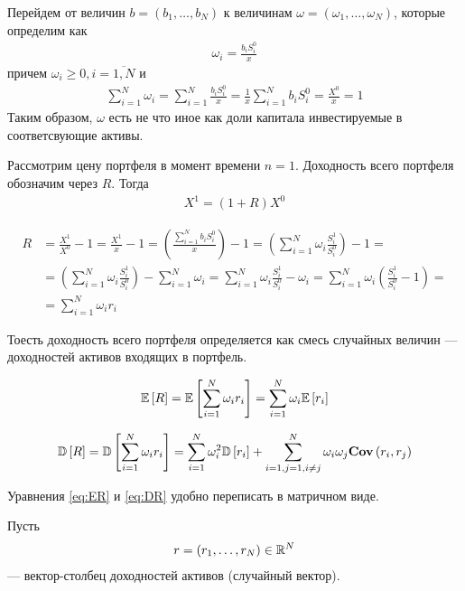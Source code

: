 Перейдем от величин $b = (b_1, \dots, b_N)$ к величинам $\omega = (\omega_1, \dots, \omega_N)$, которые определим как
\begin{align}
	\omega_i = \frac{b_i S_i^0}{x}
\end{align}
причем $\omega_i \ge 0, i=\overline{1, N}$ и
\begin{align}
	\sum_{i=1}^{N} \omega_i 
	= \sum_{i=1}^{N} \frac{b_i S_i^0}{x}
	= \frac{1}{x} \sum_{i=1}^{N} b_i S_i^0
	= \frac{X^0}{x} = 1
\end{align}
Таким образом, $\omega$ есть не что иное как доли капитала инвестируемые в соответсвующие активы.

Рассмотрим цену портфеля в момент времени $n=1$. Доходность всего портфеля обозначим через $R$. Тогда
\begin{align}
	X^1 = (1 + R) X^0
\end{align}

\begin{align}
	R &= \frac{X^1}{X^0} - 1 
	= \frac{X^1}{x} - 1 
	= \left(\frac{\sum_{i=1}^{N}b_i S_i^0}{x}\right) - 1 
	= \left(\sum_{i=1}^{N} \omega_i \frac{S_i^1}{S_i^0}\right) - 1 = \\
	&= \left(\sum_{i=1}^{N} \omega_i \frac{S_i^1}{S_i^0}\right) - \sum_{i=1}^{N} \omega_i
	= \sum_{i=1}^{N} \omega_i \frac{S_i^1}{S_i^0} - \omega_i 
	= \sum_{i=1}^{N} \omega_i \left(\frac{S_i^1}{S_i^0} - 1\right) = \\
	&= \sum_{i=1}^{N} \omega_i r_i
\end{align}

Тоесть доходность всего портфеля определяется как смесь случайных величин --- доходностей активов
входящих в портфель.

\begin{align} \label{eq:ER}
	\mathbb{E}\left[R\right] = \mathbb{E}\left[\sum_{i=1}^{N} \omega_i r_i\right] 
	= \sum_{i=1}^{N} \omega_i \mathbb{E}\left[r_i\right]
\end{align}

\begin{align} \label{eq:DR}
	\mathbb{D}\left[R\right] = \mathbb{D}\left[\sum_{i=1}^{N} \omega_i r_i\right] 
	= \sum_{i=1}^{N} \omega_i^2 \mathbb{D}\left[r_i\right] 
	+ \sum_{i=1, j=1, i \ne j}^{N} \omega_i \omega_j \textbf{Cov}\left(r_i, r_j\right)
\end{align}

Уравнения \ref{eq:ER} и \ref{eq:DR} удобно переписать в матричном виде. 

Пусть 
\begin{align}
	r = (r_1, \dots, r_N) \in \mathbb{R}^N
\end{align}
--- вектор-столбец доходностей активов (случайный вектор).

